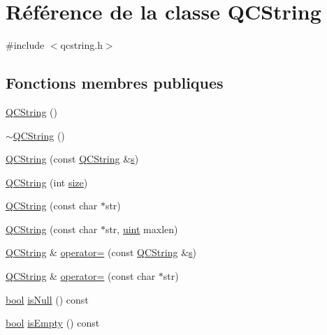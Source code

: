 \hypertarget{class_q_c_string}{}\section{Référence de la classe Q\+C\+String}
\label{class_q_c_string}


{\ttfamily \#include $<$qcstring.\+h$>$}

\subsection*{Fonctions membres publiques}
\begin{DoxyCompactItemize}
\item 
\hyperlink{class_q_c_string_ac81b67245a4667f5f257e75b2f99e278}{Q\+C\+String} ()
\item 
\hyperlink{class_q_c_string_a285551aa9238c4ee4473ba136bf4431a}{$\sim$\+Q\+C\+String} ()
\item 
\hyperlink{class_q_c_string_abf5e7eee86ecd3982c4b1315bc181cff}{Q\+C\+String} (const \hyperlink{class_q_c_string}{Q\+C\+String} \&\hyperlink{060__command__switch_8tcl_a011c73f2dbb87635a3b4206c72355f6e}{s})
\item 
\hyperlink{class_q_c_string_a5a6639003e7bb8bb95189445649e0c2a}{Q\+C\+String} (int \hyperlink{class_q_c_string_aabd08432ddd836c2836b2ddfbfd8ed7c}{size})
\item 
\hyperlink{class_q_c_string_a2286f03edc20befca29cd2b2f57de1f6}{Q\+C\+String} (const char $\ast$str)
\item 
\hyperlink{class_q_c_string_a0a7f38230a080e7583bf2747d587cc7d}{Q\+C\+String} (const char $\ast$str, \hyperlink{qglobal_8h_a4d3943ddea65db7163a58e6c7e8df95a}{uint} maxlen)
\item 
\hyperlink{class_q_c_string}{Q\+C\+String} \& \hyperlink{class_q_c_string_a2f76b7f0c570b83ed75e8891cf2736b6}{operator=} (const \hyperlink{class_q_c_string}{Q\+C\+String} \&\hyperlink{060__command__switch_8tcl_a011c73f2dbb87635a3b4206c72355f6e}{s})
\item 
\hyperlink{class_q_c_string}{Q\+C\+String} \& \hyperlink{class_q_c_string_aff5d046c512aee21b575abb2b7528282}{operator=} (const char $\ast$str)
\item 
\hyperlink{qglobal_8h_a1062901a7428fdd9c7f180f5e01ea056}{bool} \hyperlink{class_q_c_string_a8d1319d2b5f0ec85418a7ea59d1df059}{is\+Null} () const 
\item 
\hyperlink{qglobal_8h_a1062901a7428fdd9c7f180f5e01ea056}{bool} \hyperlink{class_q_c_string_a3d7143df90b9c773a893ba7603642a59}{is\+Empty} () const 

\end{DoxyCompactItemize}
